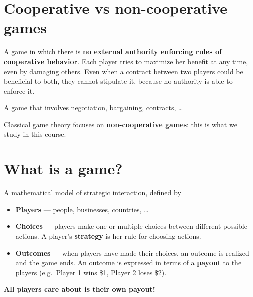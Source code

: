 \documentclass[11pt,a4paper,openany]{book}
\begin{document}
\section{Cooperative vs non-cooperative games}

\begin{defnbox}[title=Non-cooperative game]
A game in which there is \textbf{no external authority enforcing rules of cooperative
behavior}. Each player tries to maximize her benefit at any time, even by damaging others.
Even when a contract between two players could be beneficial to both, they cannot stipulate
it, because no authority is able to enforce it.
\end{defnbox}

\begin{defnbox}[title=Cooperative game]
A game that involves negotiation, bargaining, contracts, \ldots
\end{defnbox}

\begin{rembox}[title=Scope of the course]
Classical game theory focuses on \textbf{non-cooperative games}: this is what we study in
this course.
\end{rembox}


\section{What is a game?}

\begin{defnbox}[title=Game]
A mathematical model of strategic interaction, defined by
\begin{itemize}
  \item \textbf{Players} --- people, businesses, countries, \ldots
  \item \textbf{Choices} --- players make one or multiple choices between different possible
        actions. A player's \textbf{strategy} is her rule for choosing actions.
  \item \textbf{Outcomes} --- when players have made their choices, an outcome is realized
        and the game ends. An outcome is expressed in terms of a \textbf{payout} to the
        players (e.g.\ Player 1 wins \$1, Player 2 loses \$2).
\end{itemize}
\end{defnbox}

\begin{keybox}[title=The one assumption common to all games]
\textbf{All players care about is their own payout!}
\end{keybox}
\end{document}
